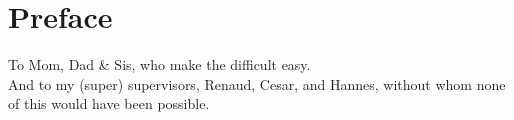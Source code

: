 \chapter*{Preface}

To Mom, Dad \& Sis, who make the difficult easy.\\
And to my (super) supervisors, Renaud, Cesar, and Hannes, without whom none of this would have been possible.\\
